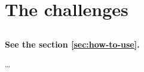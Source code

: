 \part{The challenges}
\chapter{}
\label{sec:Introduction}

\textbf{See the section \ref{sec:how-to-use}.}

\cite{Feil2019}
\dots
\Blindtext
